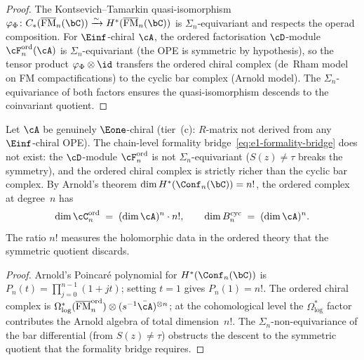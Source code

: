 \begin{proof}
The Kontsevich--Tamarkin quasi-isomorphism
$\varphi_\Phi \colon
C_*(\overline{\operatorname{FM}}_n(\bC))
\xrightarrow{\sim}
H^*(\overline{\operatorname{FM}}_n(\bC))$
is $\Sigma_n$-equivariant and respects the operad
composition. For $\Einf$-chiral $\cA$, the ordered
factorisation $\cD$-module
$\cF^{\mathrm{ord}}_n(\cA)$ is $\Sigma_n$-equivariant
(the OPE is symmetric by hypothesis), so the
tensor product $\varphi_\Phi \otimes \id$ transfers the
ordered chiral complex (de~Rham model on FM
compactifications) to the cyclic bar complex (Arnold model).
The $\Sigma_n$-equivariance of both factors ensures the
quasi-isomorphism descends to the coinvariant quotient.
\end{proof}

\begin{theorem}
\label{thm:e1-formality-failure}
\ClaimStatusProvedHere
{}
Let $\cA$ be genuinely $\Eone$-chiral
\textup{(}tier~(c): $R$-matrix not derived from any
$\Einf$-chiral OPE\textup{)}. The chain-level
formality bridge~\eqref{eq:e1-formality-bridge} does not
exist: the $\cD$-module $\cF_n^{\mathrm{ord}}$ is not
$\Sigma_n$-equivariant \textup{(}$S(z) \neq \tau$ breaks
the symmetry\textup{)}, and the ordered chiral complex
is strictly richer than the cyclic bar complex. By
Arnold's theorem $\dim H^*(\Conf_n(\bC)) = n!$, the
ordered complex at degree~$n$ has
\begin{equation}\label{eq:e1-dim-ratio}
\dim \cC_n^{\mathrm{ord}} \;=\;
(\dim \cA)^n \cdot n!,
\qquad
\dim B_n^{\mathrm{cyc}} \;=\; (\dim \cA)^n.
\end{equation}
The ratio $n!$ measures the holomorphic data in the
ordered theory that the symmetric quotient discards.
\end{theorem}

\begin{proof}
Arnold's Poincar\'e polynomial for
$H^*(\Conf_n(\bC))$ is
$P_n(t) = \prod_{j=0}^{n-1}(1 + jt)$; setting $t=1$
gives $P_n(1) = n!$. The ordered chiral complex is
$\Omega^*_{\log}(\overline{\operatorname{FM}}_n^{\mathrm{ord}})
\otimes (s^{-1}\bar\cA)^{\otimes n}$; at the
cohomological level the $\Omega^*_{\log}$ factor
contributes the Arnold algebra of total dimension~$n!$.
The $\Sigma_n$-non-equivariance of the bar differential
(from $S(z) \neq \tau$) obstructs the descent to the
symmetric quotient that the formality bridge requires.
\end{proof}

